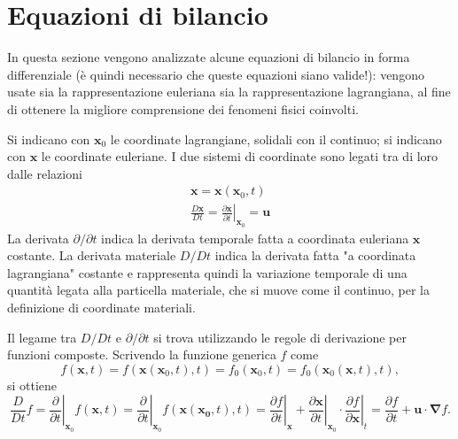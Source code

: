 \section{Equazioni di bilancio}

In questa sezione vengono analizzate alcune equazioni di bilancio
 in forma differenziale (è quindi necessario che queste equazioni siano
 valide!):
 vengono usate sia la rappresentazione euleriana sia la rappresentazione
 lagrangiana, al fine di ottenere la migliore comprensione dei fenomeni 
 fisici coinvolti.
 
Si indicano con $\bm{x}_0$ le coordinate lagrangiane, solidali con il 
 continuo; si indicano con $\bm{x}$ le coordinate euleriane.
I due sistemi di coordinate sono legati tra di loro dalle relazioni
\begin{equation}
\begin{aligned}
 \bm{x} = \bm{x}(\bm{x}_0,t) \\
 \frac{D \bm{x}}{D t} = \left.\frac{\partial \bm{x}}{\partial t}\right|_{\bm{x}_0} = 
 \bm{u}
\end{aligned}
\end{equation}
La derivata $\partial/\partial t$ indica la derivata temporale fatta
 a coordinata euleriana $\bm{x}$ costante. La derivata materiale 
 $D/D t$ indica la derivata fatta "a coordinata lagrangiana" costante
 e rappresenta quindi la variazione temporale di una quantità legata
 alla particella materiale, che si muove come il continuo, per la definizione
 di coordinate materiali.

\noindent
Il legame tra $D/Dt$ e $\partial/\partial t$ si trova utilizzando le
 regole di derivazione per funzioni composte. Scrivendo la funzione generica $f$ come
\begin{equation}
 f(\bm{x},t) = f(\bm{x}(\bm{x}_0,t),t)
  = f_0(\bm{x}_0,t) = f_0(\bm{x}_0(\bm{x},t),t) ,
\end{equation}
%
si ottiene
\begin{equation}
 \frac{D}{Dt} f = \left.\frac{\partial}{\partial t}\right|_{\bm{x}_0} f(\bm{x},t) =
   \left.\frac{\partial}{\partial t}\right|_{\bm{x}_0} f(\bm{x}(\bm{x_0},t),t) = 
   \left.\frac{\partial f}{\partial t}\right|_{\bm{x}} +
   \left.\frac{\partial \bm{x}}{\partial t}\right|_{\bm{x}_0} \cdot
   \left.\frac{\partial f}{\partial \bm{x}}\right|_{t}
   = \frac{\partial f}{\partial t} +
    \bm{u} \cdot \bm{\nabla} f .
\end{equation}


